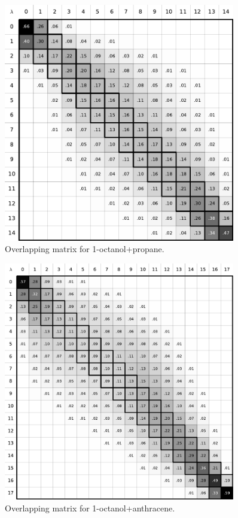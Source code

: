 \documentclass[
	12pt,				%
	openany,			%
	oneside,			%
	a4paper,			%
	english,			%
	brazil				%
	]{abntex2}
\begin{document}
\begin{apendicesenv}
\begin{figure}[H]
	\centering
	\includegraphics[width=0.9\textwidth]{Figures/ooct_prop}
	\caption{Overlapping matrix for 1-octanol+propane.}
\end{figure}

\begin{figure}[H]
	\centering
	\includegraphics[width=0.9\textwidth]{Figures/ooct_ant}
	\caption{Overlapping matrix for 1-octanol+anthracene.}
\end{figure}


\end{apendicesenv}
\end{document}
